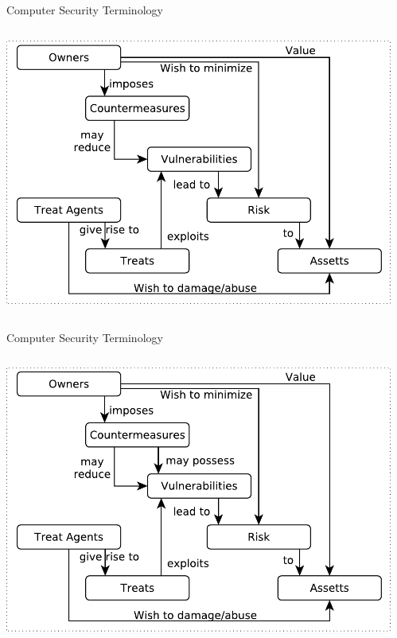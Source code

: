 \documentclass{beamer}
\begin{document}
\begin{frame}{Computer Security Terminology}
\begin{columns}[onlytextwidth]
    \begin{column}{0.6\textwidth}
\includegraphics[width=1\linewidth]{term-6}
  \end{column}
    \begin{column}{0.4\textwidth}
 \end{column}
\end{columns}
\end{frame}

\begin{frame}{Computer Security Terminology}
\begin{columns}[onlytextwidth]
    \begin{column}{0.6\textwidth}
\includegraphics[width=1\linewidth]{term-final}
  \end{column}
    \begin{column}{0.4\textwidth}
  \end{column}
\end{columns}
\end{frame}
\end{document}
